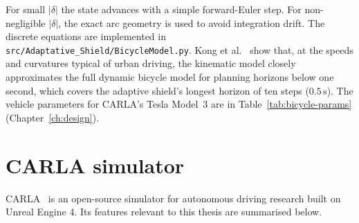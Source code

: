 For small \(|\delta|\) the state advances with a simple forward-Euler step. For non-negligible
\(|\delta|\), the exact arc geometry is used to avoid integration drift. The discrete equations
are implemented in \texttt{src/Adaptative\_Shield/BicycleModel.py}. Kong et
al.~\cite{kong2015kinematic} show that, at the speeds and curvatures typical of urban driving,
the kinematic model closely approximates the full dynamic bicycle model for planning horizons
below one second, which covers the adaptive shield's longest horizon of ten steps
(\(0.5\,\mathrm{s}\)). The vehicle parameters for CARLA's Tesla Model~3 are in
Table~\ref{tab:bicycle-params} (Chapter~\ref{ch:design}).

\section{CARLA simulator}\label{sec:sota-carla}

CARLA~\cite{dosovitskiy2017carla} is an open-source simulator for autonomous driving research
built on Unreal Engine 4. Its features relevant to this thesis are summarised below.

